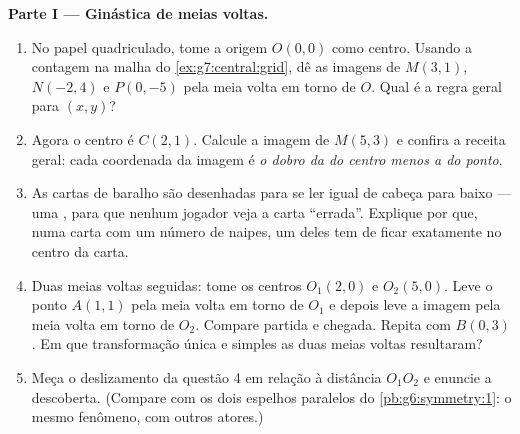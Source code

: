 \begin{problem}
\medskip
\noindent\textbf{Parte I --- Ginástica de meias voltas.}
\begin{enumerate}
  \item No papel quadriculado, tome a origem $O(0, 0)$ como centro.
        Usando a contagem na malha do \cref{ex:g7:central:grid}, dê as
        imagens de $M(3, 1)$, $N(-2, 4)$ e $P(0, -5)$ pela meia volta
        em torno de $O$. Qual é a regra geral para $(x, y)$?
  \item Agora o centro é $C(2, 1)$. Calcule a imagem de $M(5, 3)$ e
        confira a receita geral: cada coordenada da imagem é \emph{o
        dobro da do centro menos a do ponto}.
  \item As cartas de baralho são desenhadas para se ler igual de cabeça
        para baixo --- uma , para que nenhum jogador
        veja a carta ``errada''. Explique por que, numa carta com um
        número \emph{} de naipes, um deles tem de ficar exatamente
        no centro da carta.
  \item Duas meias voltas seguidas: tome os centros $O_1(2, 0)$ e
        $O_2(5, 0)$. Leve o ponto $A(1, 1)$ pela meia volta em torno de
        $O_1$ e depois leve a imagem pela meia volta em torno de $O_2$.
        Compare partida e chegada. Repita com $B(0, 3)$. Em que
        transformação única e simples as duas meias voltas
        resultaram?
  \item Meça o deslizamento da questão 4 em relação à distância
        $O_1 O_2$ e enuncie a descoberta. (Compare com os dois espelhos
        paralelos do \cref{pb:g6:symmetry:1}: o mesmo fenômeno, com
        outros atores.)
\end{enumerate}


\end{problem}

